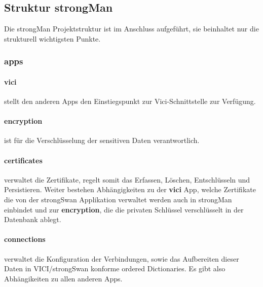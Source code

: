 \subsection{Struktur strongMan}
Die strongMan Projektstruktur ist im Anschluss aufgeführt, sie beinhaltet nur die strukturell wichtigsten Punkte.\\
\begin{figure}[H]
\end{figure}

\medskip

\subsubsection{apps}
\par
\begingroup
\leftskip=0.5cm 
\noindent
\paragraph{vici} stellt den anderen Apps den Einstiegspunkt zur Vici-Schnittstelle zur Verfügung. 

\paragraph{encryption} ist für die Verschlüsselung der sensitiven Daten verantwortlich.

\paragraph{certificates} verwaltet die Zertifikate, regelt somit das Erfassen, Löschen, Entschlüsseln und Persistieren. Weiter bestehen Abhängigkeiten zu der \textbf{vici} App, welche Zertifikate die von der strongSwan Applikation
verwaltet werden auch in strongMan einbindet und zur \textbf{encryption}, die die privaten Schlüssel verschlüsselt in der Datenbank ablegt.

\paragraph{connections} verwaltet die Konfiguration der Verbindungen, sowie das Aufbereiten dieser Daten in VICI/strongSwan konforme ordered Dictionaries. Es gibt also Abhängikeiten zu allen anderen Apps.

\par
\endgroup

